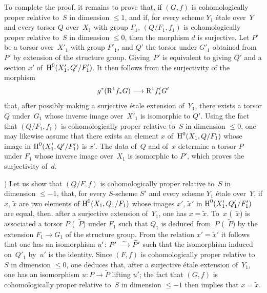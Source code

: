 To complete the proof, it remains to prove that, if
$(G,f)$ is cohomologically proper relative to~$S$ in
dimension $\leqslant 1$, and if, for every scheme $Y_1$ \'etale
over~$Y$ and every torsor $Q$ over~$X_1$ with group $F_1$,
$(Q/F_1, f_1)$ is cohomologically proper relative to~$S$ in
dimension $\leqslant 0$, then the morphism $d$ is surjective. Let
$P'$ be a torsor over~$X'_1$ with group $F'_1$, and $Q'$ the torsor under
$G'_1$ obtained from~$P'$ by extension of the structure
group. Giving~$P'$ is equivalent to giving
$Q'$ and a section $x'$ of~$\operatorname{H}^0(X'_1,Q'/F'_1)$. It then
follows from the surjectivity of the morphism
$$
g^*(\R^1 f_* G) \to \R^1 f'_* G'
$$
that, after possibly making a surjective \'etale extension of~$Y_1$,
there exists a torsor $Q$ under~$G_1$ whose inverse image over~$X'_1$
is isomorphic to $Q'$. Using the fact that $(Q/F_1, f_1)$ is
cohomologically proper relative to~$S$ in dimension
$\leqslant 0$, one may likewise assume that there exists an
element $x$ of~$\operatorname{H}^0(X_1, Q/F_1)$ whose image in
$\operatorname{H}^0(X'_1, Q'/F'_1)$ is $x'$. The data of~$Q$ and of~$x$
determine a torsor $P$ under $F_1$ whose inverse image over~$X_1$ is isomorphic to $P'$, which proves the
surjectivity of~$d$.

) Let us show that $(Q/F,f)$ is cohomologically proper
relative to~$S$ in dimension $\leqslant -1$, \ie that, for
every $S$-scheme $S'$ and every scheme $Y_1$ \'etale
over~$Y$, if $x$, $\tilde{x}$ are two elements of
$\operatorname{H}^0(X_1,Q_1/F_1)$ whose images $x'$, $\tilde{x}'$ in
$\operatorname{H}^0(X'_1, Q'_1/F'_1)$ are equal, then, after a surjective
extension of~$Y_1$, one has $x = \tilde{x}$. To~$x$ (\resp~$\tilde{x}$)
is associated a torsor $P$ (\resp~$\tilde{P}$) under $F_1$ such that
$Q_1$ is deduced from~$P$ (\resp~$\tilde{P}$) by the extension $F_1
\to G_1$ of the structure group. From the relation $x' = \tilde{x}'$
it follows that one has an isomorphism $u' \colon P' \overset{\sim}{\longrightarrow}
\widetilde{P}'$ such that the isomorphism induced on~$Q'_1$ by~$u'$ is
the identity. Since $(F,f)$ is cohomologically proper
relative to~$S$ in dimension $\leqslant 0$, one deduces
that,
after a surjective \'etale extension of~$Y_1$, one has an
isomorphism $u \colon P \to \tilde{P}$ lifting $u'$; the fact that
$(G,f)$ is cohomologically proper relative to~$S$ in
dimension $\leqslant -1$ then implies that $x =
\tilde{x}$.

